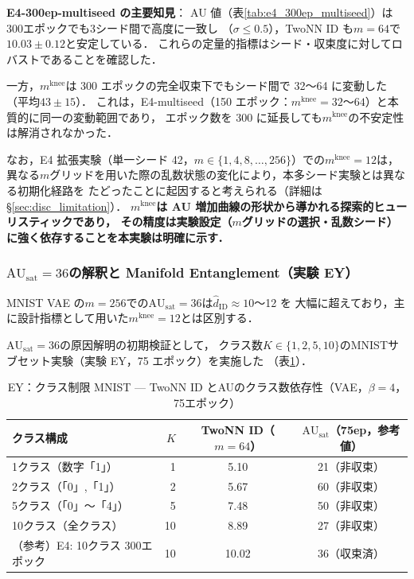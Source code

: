 \documentclass[11pt,a4paper]{jsarticle}
\newcommand{\AUsat}{\mathrm{AU}_{\mathrm{sat}}}
\newcommand{\mknee}{m^{\mathrm{knee}}}
\begin{document}
\textbf{E4-300ep-multiseed の主要知見}：
AU 値（表\ref{tab:e4_300ep_multiseed}）は300エポックでも3シード間で高度に一致し
（$\sigma \leq 0.5$），TwoNN ID も$m = 64$で$10.03 \pm 0.12$と安定している．
これらの定量的指標はシード・収束度に対してロバストであることを確認した．

一方，$\mknee$は 300 エポックの完全収束下でもシード間で 32〜64 に変動した
（平均$43 \pm 15$）．
これは，E4-multiseed（150 エポック：$\mknee = 32$〜$64$）と本質的に同一の変動範囲であり，
エポック数を 300 に延長しても$\mknee$の不安定性は解消されなかった．

なお，E4 拡張実験（単一シード 42，$m \in \{1, 4, 8, \ldots, 256\}$）での$\mknee = 12$は，
異なる$m$グリッドを用いた際の乱数状態の変化により，本多シード実験とは異なる初期化経路を
たどったことに起因すると考えられる（詳細は§\ref{sec:disc_limitation}）．
\textbf{$\mknee$は AU 増加曲線の形状から導かれる探索的ヒューリスティックであり，
その精度は実験設定（$m$グリッドの選択・乱数シード）に強く依存することを本実験は明確に示す．}

\subsubsection{$\AUsat = 36$の解釈と Manifold Entanglement（実験 EY）}

MNIST VAE の$m = 256$での$\AUsat = 36$は$\hat{d}_\mathrm{ID} \approx 10$〜12 を
大幅に超えており，主に設計指標として用いた$\mknee = 12$とは区別する．

$\AUsat = 36$の原因解明の初期検証として，
クラス数$K \in \{1, 2, 5, 10\}$のMNISTサブセット実験（実験 EY，75 エポック）を実施した
（表\ref{tab:ey}）．

\begin{table}[H]
\centering
\caption{EY：クラス制限 MNIST — TwoNN ID とAUのクラス数依存性（VAE，$\beta=4$，75エポック）}
\label{tab:ey}
\small
\begin{tabular}{lrcc}
\toprule
クラス構成 & $K$ & TwoNN ID（$m=64$） & $\AUsat$（75ep，参考値） \\
\midrule
1クラス（数字「1」） & 1  & 5.10 & 21（非収束） \\
2クラス（「0」,「1」） & 2  & 5.67 & 60（非収束） \\
5クラス（「0」〜「4」）& 5  & 7.48 & 50（非収束） \\
10クラス（全クラス）  & 10 & 8.89 & 27（非収束） \\
\midrule
（参考）E4: 10クラス 300エポック & 10 & 10.02 & 36（収束済） \\
\bottomrule
\end{tabular}
\end{table}
\end{document}

